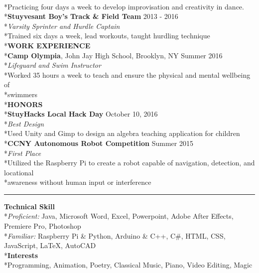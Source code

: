 \documentclass[11pt]{letter}
\begin{document}
\begin{flushleft}
\\*\qquad Practicing four days a week to develop improvisation and creativity in dance. 
\\*\textbf{Stuyvesant Boy's Track \& Field Team} \hfill 2013 - 2016
\\*\textit{Varsity Sprinter and Hurdle Captain}
\\*\qquad Trained six days a week, lead workouts, taught hurdling technique
\vspace{7.5mm}
\\*\large\textbf{WORK EXPERIENCE}
\\*\normalsize\textbf{Camp Olympia}, John Jay High School, Brooklyn, NY \hfill Summer 2016
\\*\textit{Lifeguard and Swim Instructor}
\\*\qquad Worked 35 hours a week to teach and ensure the physical and mental wellbeing of 
\\*\qquad swimmers
\vspace{7.5mm}
\\*\large\textbf{HONORS}
\\*\normalsize\textbf{StuyHacks Local Hack Day} \hfill October 10, 2016
\\*\textit{Best Design}
\\*\qquad Used Unity and Gimp to design an algebra teaching application for children
\\*\textbf{CCNY Autonomous Robot Competition} \hfill Summer 2015
\\*\textit{First Place}
\\*\qquad Utilized the Raspberry Pi to create a robot capable of navigation, detection, and locational \\*\qquad awareness without human input or interference
\bigskip
\vspace{-5mm}\rule{\textwidth}{1pt}
\textbf{Technical Skill}
\\*\textit{Proficient: }Java, Microsoft Word, Excel, Powerpoint, Adobe After Effects, Premiere Pro, Photoshop
\\*\textit{Familiar: }Raspberry Pi \& Python, Arduino \& C++, C\#, HTML, CSS, JavaScript, LaTeX, AutoCAD
\\*\textbf{Interests}
\\*Programming, Animation, Poetry, Classical Music, Piano, Video Editing, Magic


\end{flushleft}
\end{document}
